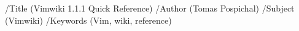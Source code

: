 %
\pdfpageheight=21cm  %
\pdfpagewidth=29.7cm
\pdfinfo %
{/Title (Vimwiki 1.1.1 Quick Reference)
 /Author (Tomas Pospichal)
 /Subject (Vimwiki)
 /Keywords (Vim, wiki, reference)}
\def\bluelink#1#2{%
\leavevmode%
\begingroup\pdfstartlink%
attr{/BS<</Type/Border/S/S/W 1>>/C [0 0 1]}%
user{/Subtype/Link/A<</Type/Action/S/URI/URI(#1)>>}%
\ignorespaces#2%
\pdfendlink\endgroup%
}

